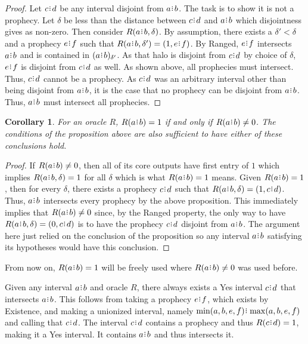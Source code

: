 \documentclass[12pt]{article}
\newtheorem{corollary}{Corollary}[section]
\begin{document}
\begin{proof}
     Let $c\rint d$ be any interval disjoint from $a\rint b$. The task is to show it is not a prophecy. Let $\delta$ be less than the distance between $c \rint d$ and $a \rint b$ which disjointness gives as non-zero. Then consider $R(a \rint b, \delta)$. By assumption, there exists a $\delta' < \delta$ and a prophecy $e \rint f$ such that $R(a \rint b, \delta') = (1, e \rint f)$. By Ranged, $e \rint f$ intersects $a \rint b$ and is contained in $\halo[\delta']{a \rint b}$. As that halo is disjoint from $c \rint d$ by choice of $\delta$, $e \rint f$ is disjoint from $c\rint d$ as well. As shown above, all prophecies must intersect. Thus, $c\rint d$ cannot be a prophecy. As $c\rint d$ was an arbitrary interval other than being disjoint from $a\rint b$, it is the case that no prophecy can be disjoint from $a\rint b$. Thus, $a\rint b$ must intersect all prophecies.
\end{proof}

\begin{corollary}
    For an oracle $R$, $R(a\rint b) = 1$ if and only if $R(a\rint b) \neq 0$. The conditions of the proposition above are also sufficient to have either of these conclusions hold. 
\end{corollary}

\begin{proof}
    If $R(a\rint b) \neq 0$, then all of its core outputs have first entry of $1$ which implies $R(a\rint b, \delta)=1$ for all $\delta$ which is what $R(a\rint b) = 1$ means. Given $R(a\rint b)= 1$, then for every $\delta$, there exists a prophecy $c\rint d$ such that $R(a\rint b, \delta) = (1, c\rint d)$. Thus, $a\rint b$ intersects every prophecy by the above proposition. This immediately implies that $R(a\rint b) \neq 0$ since, by the Ranged property, the only way to have $R(a\rint b, \delta) = (0, c\rint d)$ is to have the prophecy $c\rint d$ disjoint from $a\rint b$. The argument here just relied on the conclusion of the proposition so any interval $a \rint b$ satisfying its hypotheses would have this conclusion. 
\end{proof}

From now on, $R(a\rint b)=1$ will be freely used where $R(a\rint b) \neq 0$ was used before. 


Given any interval $a\rint b$ and oracle $R$, there always exists a Yes interval $c\rint d$ that intersects $a\rint b$. This follows from taking a prophecy $e\rint f$, which exists by Existence, and making a unionized interval, namely $\min(a,b,e,f)\rint \max(a,b,e,f)$ and calling that $c\rint d$. The interval $c\rint d$ contains a prophecy and thus $R(c\rint d) = 1$, making it a Yes interval. It contains $a\rint b$ and thus intersects it. 
\end{document}
